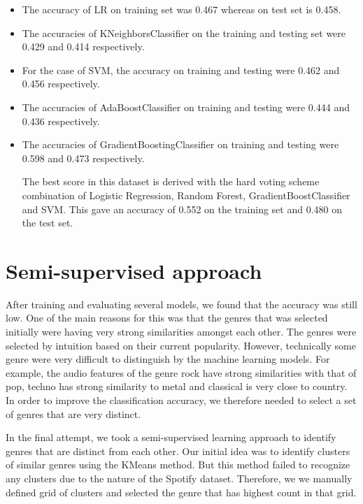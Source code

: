 \documentclass[conference]{IEEEtran}
\begin{document}
\begin{itemize}
\item The accuracy of LR on training set was 0.467 whereas on test set is 0.458.
\item The accuracies of KNeighborsClassifier on the training and testing set were 0.429 and 0.414 respectively.
\item For the case of SVM, the accuracy on training and testing were 0.462 and 0.456 respectively.
\item The accuracies of AdaBoostClassifier on training and testing were  0.444 and 0.436 respectively.
\item The accuracies of GradientBoostingClassifier on training and testing were  0.598 and 0.473 respectively.

The best score in this dataset is derived with the hard voting scheme combination of Logistic Regression, Random Forest, GradientBoostClassifier and SVM. This gave an accuracy of 0.552 on the training set and 0.480 on the test set.
\end{itemize}



\section{Semi-supervised approach}
\label{sec:orgb8f7151}

After training and evaluating several models, we found that the accuracy was still low. One of the main reasons for this was that the genres that was selected initially were having very strong similarities amongst each other. The genres were selected by intuition based on their current popularity. However, technically some genre were very difficult to distinguish by the machine learning models. For example, the audio features of the genre rock have strong similarities with that of pop, techno has strong similarity to metal and classical is very close to country. In order to improve the classification accuracy, we therefore needed to select a set of genres that are very distinct.

In the final attempt, we took a semi-supervised learning approach to identify genres that are distinct from each other. Our initial idea was to identify clusters of similar genres using the KMeans \cite{geron2019hands} method. But this method failed to recognize any clusters due to the nature of the Spotify dataset. Therefore, we we manually defined grid of clusters and selected the genre that has highest count in that grid.
\end{document}

